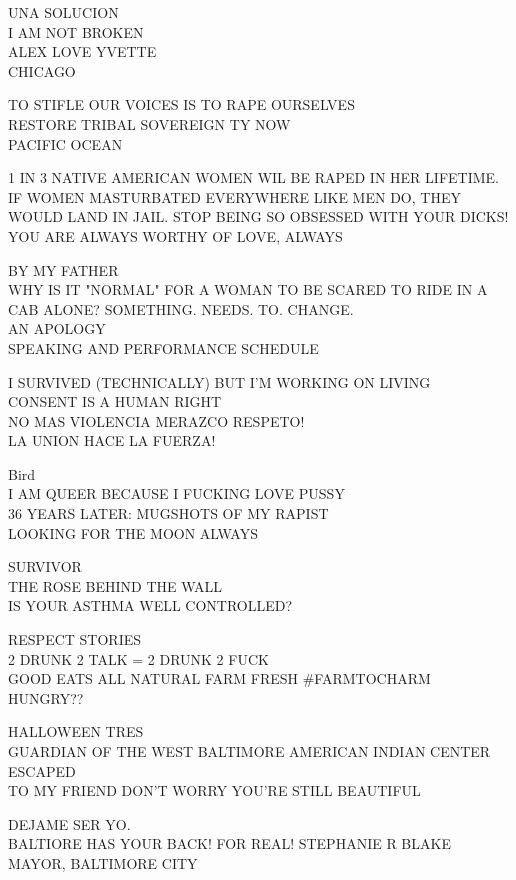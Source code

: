 \documentclass[10pt,letterpaper]{article}
\begin{document}
UNA SOLUCION\\
I AM NOT BROKEN\\
ALEX LOVE YVETTE\\
CHICAGO

TO STIFLE OUR VOICES IS TO RAPE OURSELVES\\
RESTORE TRIBAL SOVEREIGN TY NOW\\
PACIFIC OCEAN

1 IN 3 NATIVE AMERICAN WOMEN WIL BE RAPED IN HER LIFETIME.\\
IF WOMEN MASTURBATED EVERYWHERE LIKE MEN DO, THEY WOULD LAND IN JAIL.  STOP BEING SO OBSESSED WITH YOUR DICKS!\\
YOU ARE ALWAYS WORTHY OF LOVE, ALWAYS

BY MY FATHER\\
WHY IS IT "NORMAL" FOR A WOMAN TO BE SCARED TO RIDE IN A CAB ALONE?  SOMETHING.  NEEDS.  TO.  CHANGE.\\
AN APOLOGY\\
SPEAKING AND PERFORMANCE SCHEDULE

I SURVIVED (TECHNICALLY) BUT I'M WORKING ON LIVING\\
CONSENT IS A HUMAN RIGHT\\
NO MAS VIOLENCIA MERAZCO RESPETO!\\
LA UNION HACE LA FUERZA!

Bird\\
I AM QUEER BECAUSE I FUCKING LOVE PUSSY\\
36 YEARS LATER: MUGSHOTS OF MY RAPIST\\
LOOKING FOR THE MOON ALWAYS

SURVIVOR\\
THE ROSE BEHIND THE WALL\\
IS YOUR ASTHMA WELL CONTROLLED?

RESPECT STORIES\\
2 DRUNK 2 TALK = 2 DRUNK 2 FUCK\\
GOOD EATS ALL NATURAL FARM FRESH \#FARMTOCHARM\\
HUNGRY??

HALLOWEEN TRES\\
GUARDIAN OF THE WEST BALTIMORE AMERICAN INDIAN CENTER\\
ESCAPED\\
TO MY FRIEND DON'T WORRY YOU'RE STILL BEAUTIFUL

DEJAME SER YO.\\
BALTIORE HAS YOUR BACK!  FOR REAL!  STEPHANIE R BLAKE MAYOR, BALTIMORE CITY
\end{document}
